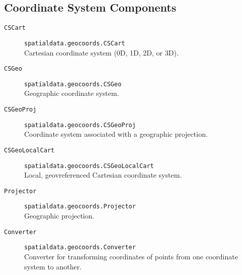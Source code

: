 \subsection{Coordinate System Components}
\begin{description}
\item [{\texttt{CSCart}}] \texttt{spatialdata.geocoords.CSCart}\\
Cartesian coordinate system (0D, 1D, 2D, or 3D).
\item [{\texttt{CSGeo}}] \texttt{spatialdata.geocoords.CSGeo}\\
Geographic coordinate system.
\item [{\texttt{CSGeoProj}}] \texttt{spatialdata.geocoords.CSGeoProj}\\
Coordinate system associated with a geographic projection.
\item [{\texttt{CSGeoLocalCart}}] \texttt{spatialdata.geocoords.CSGeoLocalCart}\\
Local, geovreferenced Cartesian coordinate system.
\item [{\texttt{Projector}}] \texttt{spatialdata.geocoords.Projector}\\
Geographic projection.
\item [{\texttt{Converter}}] \texttt{spatialdata.geocoords.Converter}\\
Converter for transforming coordinates of points from one coordinate
system to another.
\end{description}

